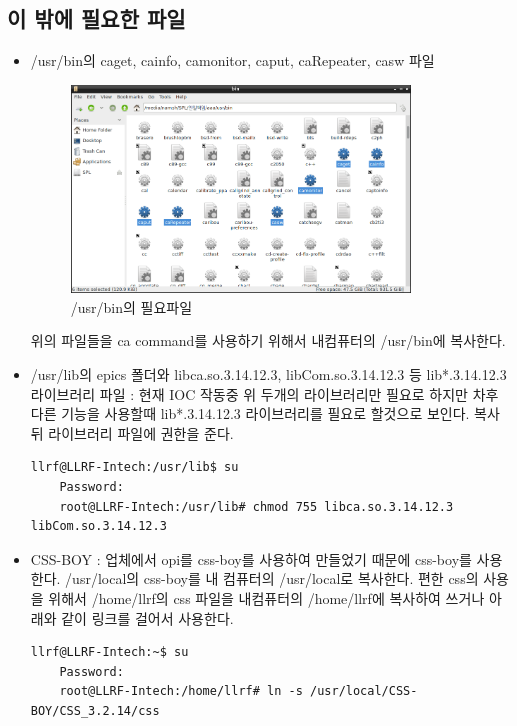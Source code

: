 \documentclass[11pt
  , a4paper
  , article
  , oneside
]{memoir}
\begin{document}
\subsection{이 밖에 필요한 파일}
\begin{itemize}
	\item /usr/bin의 caget, cainfo, camonitor, caput, caRepeater, casw 파일\\
	\begin{figure}[h!]
		\centering
		\includegraphics[width=0.85\textwidth, height=0.6\textwidth]{./images/3.png}
		\caption{/usr/bin의 필요파일}
	\end{figure}
	위의 파일들을 ca command를 사용하기 위해서 내컴퓨터의 /usr/bin에 복사한다.
	\item /usr/lib의 epics 폴더와 libca.so.3.14.12.3, libCom.so.3.14.12.3 등 lib*.3.14.12.3 라이브러리 파일 : 현재 IOC 작동중 위 두개의 라이브러리만 필요로 하지만 차후 다른 기능을 사용할때 lib*.3.14.12.3 라이브러리를 필요로 할것으로 보인다. 복사뒤 라이브러리 파일에 권한을 준다.
	\begin{lstlisting}[style=termstyle]
	llrf@LLRF-Intech:/usr/lib$ su
	Password: 
	root@LLRF-Intech:/usr/lib# chmod 755 libca.so.3.14.12.3 libCom.so.3.14.12.3
\end{lstlisting}
\item CSS-BOY : 업체에서 opi를 css-boy를 사용하여 만들었기 때문에 css-boy를 사용한다. /usr/local의 css-boy를 내 컴퓨터의 /usr/local로 복사한다. 편한 css의 사용을 위해서 /home/llrf의 css 파일을 내컴퓨터의 /home/llrf에 복사하여 쓰거나 아래와 같이 링크를 걸어서 사용한다.
	\begin{lstlisting}[style=termstyle]
	llrf@LLRF-Intech:~$ su
	Password: 
	root@LLRF-Intech:/home/llrf# ln -s /usr/local/CSS-BOY/CSS_3.2.14/css
\end{lstlisting}
\end{itemize}
\end{document}
